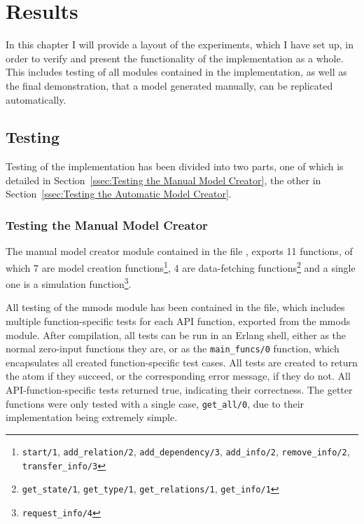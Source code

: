 \chapter{Results}

In this chapter I will provide a layout of the experiments, which I have set up, in order to verify and present the functionality of the implementation as a whole. This includes testing of all modules contained in the implementation, as well as the final demonstration, that a model generated manually, can be replicated automatically.

\section{Testing}

Testing of the implementation has been divided into two parts, one of which is detailed in Section~\ref{ssec:Testing the Manual Model Creator}, the other in Section~\ref{ssec:Testing the Automatic Model Creator}.

\subsection{Testing the Manual Model Creator}
The manual model creator module contained in the file , exports 11 functions, of which 7 are model creation functions\footnote{\lstinline{start/1}, \lstinline{add_relation/2}, \lstinline{add_dependency/3}, \lstinline{add_info/2}, \lstinline{remove_info/2}, \lstinline{transfer_info/3}}, 4 are data-fetching functions\footnote{\lstinline{get_state/1}, \lstinline{get_type/1}, \lstinline{get_relations/1}, \lstinline{get_info/1}} and a single one is a simulation function\footnote{\lstinline{request_info/4}}.

All testing of the mmods module has been contained in the  file, which includes multiple function-specific tests for each API function, exported from the mmods module. After compilation, all tests can be run in an Erlang shell, either as the normal zero-input functions they are, or as the \linebreak \lstinline{main_funcs/0} function, which encapsulates all created function-specific test cases. All tests are created to return the atom  if they succeed, or the corresponding error message, if they do not. All API-function-specific tests returned true, indicating their correctness. The getter functions were only tested with a single case, \lstinline{get_all/0}, due to their implementation being extremely simple.

